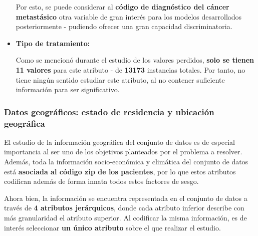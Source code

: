 \begin{itemize}[leftmargin=*]
	Por esto, se puede considerar al \textbf{código de diagnóstico del cáncer metastásico} otra variable de gran interés para los modelos desarrollados posteriormente - pudiendo ofrecer una gran capacidad discriminatoria.
	
	\item \textbf{Tipo de tratamiento:}
	
	Como se mencionó durante el estudio de los valores perdidos, \textbf{solo se tienen 11 valores} para este atributo - de \textbf{13173} instancias totales. Por tanto, no tiene ningún sentido estudiar este atributo, al no contener suficiente información para ser significativo.
\end{itemize}

\subsubsection{Datos geográficos: estado de residencia y ubicación geográfica}

El estudio de la información geográfica del conjunto de datos es de especial importancia al ser uno de los objetivos planteados por el problema a resolver. Además, toda la información socio-económica y climática del conjunto de datos está \textbf{asociada al código zip de los pacientes}, por lo que estos atributos codifican además de forma innata todos estos factores de sesgo.

Ahora bien, la información se encuentra representada en el conjunto de datos a través de \textbf{4 atributos jerárquicos}, donde cada atributo inferior describe con más granularidad el atributo superior. Al codificar la misma información, es de interés seleccionar \textbf{un único atributo} sobre el que realizar el estudio.

